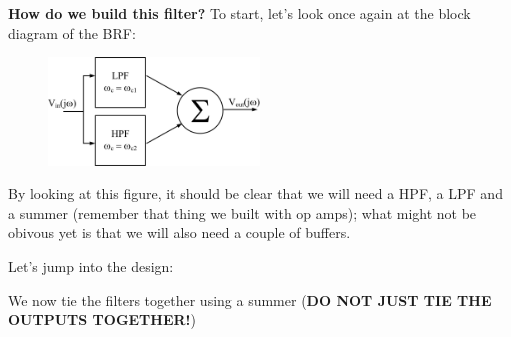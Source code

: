 \documentclass{handout}
\begin{document}
\newpage
\clearpage
\pagebreak

\textbf{How do we build this filter?}
To start, let's look once again at the block diagram of the BRF:
\begin{figure} [h!]
\centering
\includegraphics[width=0.5\textwidth]{BRFBlockDiagram.jpg}
\end{figure}

By looking at this figure, it should be clear that we will need a HPF, a LPF and a summer (remember that thing we built with op amps); what might not be obivous yet is that we will also need a couple of buffers.  

Let's jump into the design:


\newpage
\clearpage
\pagebreak

We now tie the filters together using a summer (\textbf{DO NOT JUST TIE THE OUTPUTS TOGETHER!})
\end{document}
